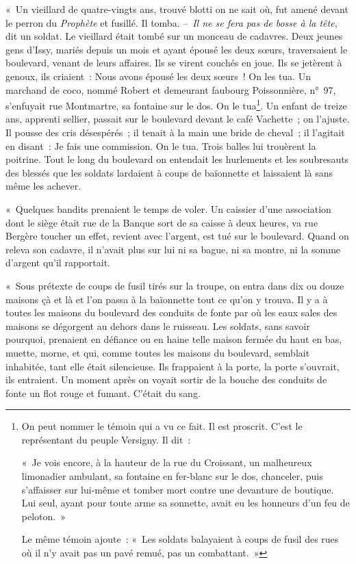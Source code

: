 \documentclass[french,twoside]{book} %
\begin{document}
« Un vieillard de quatre-vingts ans, trouvé blotti on ne sait où, fut amené devant le perron du \emph{Prophète} et fusillé. Il tomba. – \emph{Il ne se fera pas de bosse à la tête}, dit un soldat. Le vieillard était tombé sur un monceau de cadavres. Deux jeunes gens d’Issy, mariés depuis un mois et ayant épousé les deux sœurs, traversaient le boulevard, venant de leurs affaires. Ils se virent couchés en joue. Ils se jetèrent à genoux, ils criaient : Nous avons épousé les deux sœurs ! On les tua. Un marchand de coco, nommé Robert et demeurant faubourg Poissonnière, n° 97, s’enfuyait rue Montmartre, sa fontaine sur le dos. On le tua\footnote{ \noindent On peut nommer le témoin qui a vu ce fait. Il est proscrit. C’est le représentant du peuple Versigny. Il dit :\par
 « Je vois encore, à la hauteur de la rue du Croissant, un malheureux limonadier ambulant, sa fontaine en fer-blanc sur le dos, chanceler, puis s’affaisser sur lui-même et tomber mort contre une devanture de boutique. Lui seul, ayant pour toute arme sa sonnette, avait eu les honneurs d’un feu de peloton. »\par
 Le même témoin ajoute : « Les soldats balayaient à coups de fusil des rues où il n’y avait pas un pavé remué, pas un combattant. »
}. Un enfant de treize ans, apprenti sellier, passait sur le boulevard devant le café Vachette ; on l’ajuste. Il pousse des cris désespérés ; il tenait à la main une bride de cheval ; il l’agitait en disant : Je fais une commission. On le tua. Trois balles lui trouèrent la poitrine. Tout le long du boulevard on entendait les hurlements et les soubresauts des blessés que les soldats lardaient à coups de baïonnette et laissaient là sans même les achever.\par
« Quelques bandits prenaient le temps de voler. Un caissier d’une association dont le siège était rue de la Banque sort de sa caisse à deux heures, va rue Bergère toucher un effet, revient avec l’argent, est tué sur le boulevard. Quand on releva son cadavre, il n’avait plus sur lui ni sa bague, ni sa montre, ni la somme d’argent qu’il rapportait.\par
« Sous prétexte de coups de fusil tirés sur la troupe, on entra dans dix ou douze maisons çà et là et l’on passa à la baïonnette tout ce qu’on y trouva. Il y a à toutes les maisons du boulevard des conduits de fonte par où les eaux sales des maisons se dégorgent au dehors dans le ruisseau. Les soldats, sans savoir pourquoi, prenaient en défiance ou en haine telle maison fermée du haut en bas, muette, morne, et qui, comme toutes les maisons du boulevard, semblait inhabitée, tant elle était silencieuse. Ils frappaient à la porte, la porte s’ouvrait, ils entraient. Un moment après on voyait sortir de la bouche des conduits de fonte un flot rouge et fumant. C’était du sang.\par
\end{document}
